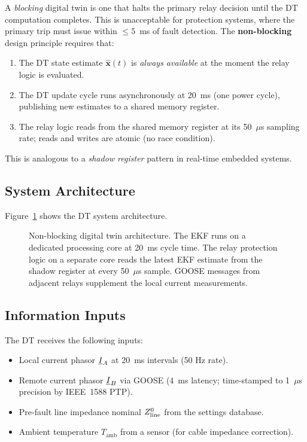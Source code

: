 A \emph{blocking} digital twin is one that halts the primary relay
decision until the DT computation completes. This is unacceptable for
protection systems, where the primary trip must issue within
$\leq 5$~ms of fault detection. The \textbf{non-blocking} design principle
requires that:
\begin{enumerate}
\item The DT state estimate $\hat{\mathbf{x}}(t)$ is \emph{always available}
      at the moment the relay logic is evaluated.
\item The DT update cycle runs asynchronously at 20~ms (one power cycle),
      publishing new estimates to a shared memory register.
\item The relay logic reads from the shared memory register at its
      50~$\mu$s sampling rate; reads and writes are atomic (no race condition).
\end{enumerate}
This is analogous to a \emph{shadow register} pattern in real-time
embedded systems.

\subsection{System Architecture}

Figure~\ref{fig:ch7_dt_architecture} shows the DT system architecture.

\begin{figure}[htbp]
  \centering
  
  \caption{Non-blocking digital twin architecture. The EKF runs on a
           dedicated processing core at 20~ms cycle time. The relay
           protection logic on a separate core reads the latest EKF
           estimate from the shadow register at every 50~$\mu$s sample.
           GOOSE messages from adjacent relays supplement the local
           current measurements.}
  \label{fig:ch7_dt_architecture}
\end{figure}

\subsection{Information Inputs}

The DT receives the following inputs:
\begin{itemize}
\item Local current phasor $\underline{I}_A$ at 20~ms intervals (50 Hz rate).
\item Remote current phasor $\underline{I}_B$ via GOOSE (4~ms latency;
      time-stamped to 1~$\mu$s precision by IEEE~1588 PTP).
\item Pre-fault line impedance nominal $Z_\mathrm{line}^0$ from the settings database.
\item Ambient temperature $T_\mathrm{amb}$ from a sensor (for cable impedance correction).
\end{itemize}

